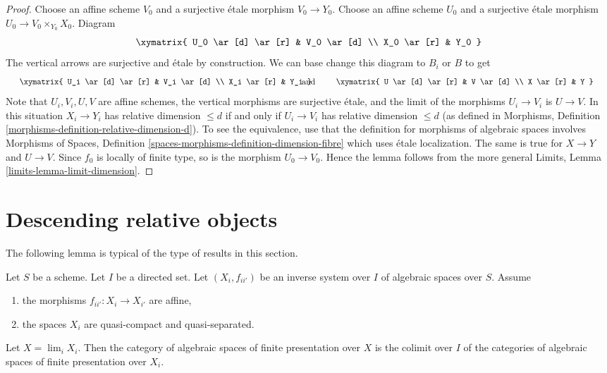 \begin{proof}
Choose an affine scheme $V_0$ and a surjective \'etale morphism
$V_0 \to Y_0$. Choose an affine scheme $U_0$ and a surjective \'etale
morphism $U_0 \to V_0 \times_{Y_0} X_0$. Diagram
$$
\xymatrix{
U_0 \ar[d] \ar[r] & V_0 \ar[d] \\
X_0 \ar[r] & Y_0
}
$$
The vertical arrows are surjective and \'etale by construction.
We can base change this diagram to $B_i$ or $B$ to get
$$
\vcenter{
\xymatrix{
U_i \ar[d] \ar[r] & V_i \ar[d] \\
X_i \ar[r] & Y_i
}
}
\quad\text{and}\quad
\vcenter{
\xymatrix{
U \ar[d] \ar[r] & V \ar[d] \\
X \ar[r] & Y
}
}
$$
Note that $U_i, V_i, U, V$ are affine schemes,
the vertical morphisms are surjective \'etale, and the limit of the
morphisms $U_i \to V_i$ is $U \to V$.
In this situation $X_i \to Y_i$ has relative dimension $\leq d$
if and only if $U_i \to V_i$ has relative dimension $\leq d$
(as defined in Morphisms, Definition
\ref{morphisms-definition-relative-dimension-d}).
To see the equivalence, use that the definition for morphisms
of algebraic spaces involves Morphisms of Spaces, Definition
\ref{spaces-morphisms-definition-dimension-fibre}
which uses \'etale localization. The same is true for $X \to Y$ and $U \to V$.
Since $f_0$ is locally of finite type, so is the morphism $U_0 \to V_0$.
Hence the lemma follows from the more general
Limits, Lemma \ref{limits-lemma-limit-dimension}.
\end{proof}














\section{Descending relative objects}
\label{section-descending-relative}

\noindent
The following lemma is typical of the type of results in this section.

\begin{lemma}
\label{lemma-descend-finite-presentation}
Let $S$ be a scheme. Let $I$ be a directed set.
Let $(X_i, f_{ii'})$ be an inverse system over $I$ of algebraic spaces
over $S$. Assume
\begin{enumerate}
\item the morphisms $f_{ii'} : X_i \to X_{i'}$ are affine,
\item the spaces $X_i$ are quasi-compact and quasi-separated.
\end{enumerate}
Let $X = \lim_i X_i$. Then the category of algebraic spaces
of finite presentation over $X$ is the colimit over $I$ of the
categories of algebraic spaces of finite presentation over $X_i$.
\end{lemma}

